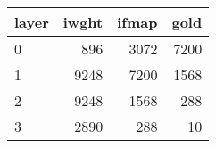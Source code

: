 \begin{tabular}{lrrr}
\toprule
layer &  iwght &  ifmap &  gold \\
\midrule
    0 &    896 &   3072 &  7200 \\
    1 &   9248 &   7200 &  1568 \\
    2 &   9248 &   1568 &   288 \\
    3 &   2890 &    288 &    10 \\
\bottomrule
\end{tabular}
